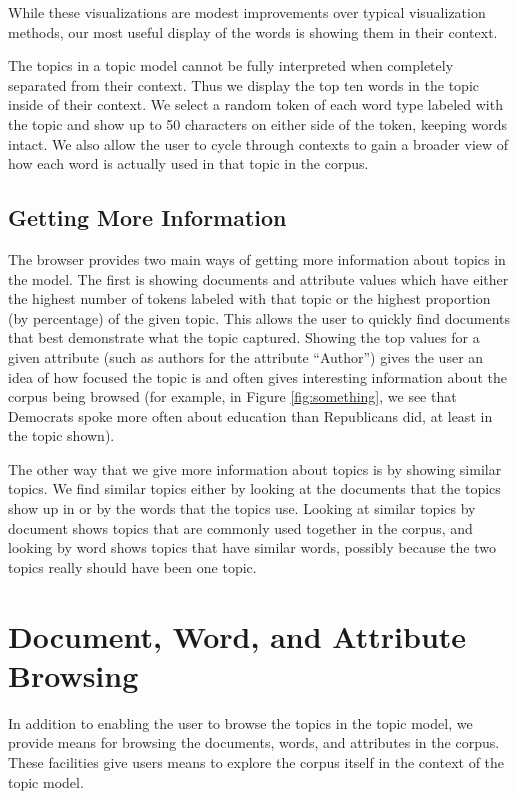 \documentclass{article}
\begin{document}
While these visualizations are modest improvements over typical visualization
methods, our most useful display of the words is showing them in their context.

The topics in a topic model cannot be fully interpreted when completely
separated from their context.  Thus we display the top ten words in the topic
inside of their context.  We select a random token of each word type labeled
with the topic and show up to 50 characters on either side of the token,
keeping words intact.  We also allow the user to cycle through contexts to gain
a broader view of how each word is actually used in that topic in the corpus.

\subsection{Getting More Information}

The browser provides two main ways of getting more information about topics in
the model.  The first is showing documents and attribute values which have
either the highest number of tokens labeled with that topic or the highest
proportion (by percentage) of the given topic.  This allows the user to quickly
find documents that best demonstrate what the topic captured.  Showing the top
values for a given attribute (such as authors for the attribute ``Author'')
gives the user an idea of how focused the topic is and often gives interesting
information about the corpus being browsed (for example, in Figure
\ref{fig:something}, we see that Democrats spoke more often about education
than Republicans did, at least in the topic shown).

The other way that we give more information about topics is by showing similar
topics.  We find similar topics either by looking at the documents that the
topics show up in or by the words that the topics use.  Looking at similar
topics by document shows topics that are commonly used together in the corpus,
and looking by word shows topics that have similar words, possibly because the
two topics really should have been one topic.

\section{Document, Word, and Attribute Browsing}

In addition to enabling the user to browse the topics in the topic model, we
provide means for browsing the documents, words, and attributes in the corpus.
These facilities give users means to explore the corpus itself in the context
of the topic model.
\end{document}
